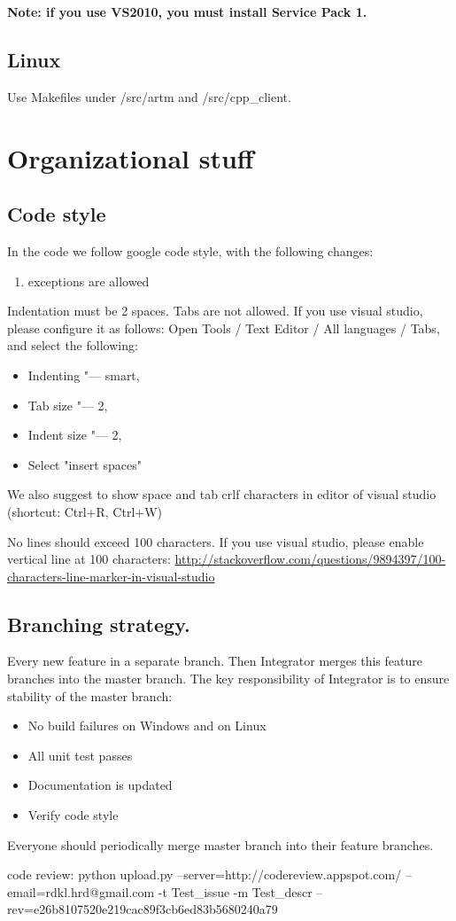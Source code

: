 \documentclass[11pt,a4paper,twoside]{report}
\begin{document}
{\bf Note: if you use VS2010, you must install Service Pack 1.}

\subsection{Linux}

Use Makefiles under /src/artm and /src/cpp\_client.

\section{Organizational stuff}

\subsection{Code style}
In the code we follow google code style, with the following changes:
\begin{enumerate}
    \item exceptions are allowed
\end{enumerate}

\item Indentation must be 2 spaces. Tabs are not allowed.
      If you use visual studio, please configure it as follows:
      Open Tools / Text Editor / All languages / Tabs, and select the following:
      \begin{itemize}
          \item Indenting "--- smart,
          \item Tab size "--- 2,
          \item Indent size "--- 2,
          \item Select "insert spaces"
      \end{itemize}
   We also suggest to show space and tab crlf characters in editor of visual studio (shortcut: Ctrl+R, Ctrl+W)
\item No lines should exceed 100 characters.
      If you use visual studio, please enable vertical line at 100 characters:
      \url{http://stackoverflow.com/questions/9894397/100-characters-line-marker-in-visual-studio}

\subsection{Branching strategy.}
Every new feature in a separate branch.
Then Integrator merges this feature branches into the master branch.
The key responsibility of Integrator is to ensure stability of the master branch:
\begin{itemize}
    \item No build failures on Windows and on Linux
    \item All unit test passes
    \item Documentation is updated
    \item Verify code style
\end{itemize}
Everyone should periodically merge master branch into their feature branches.

code review:
python upload.py --server=http://codereview.appspot.com/ --email=rdkl.hrd@gmail.com  -t Test_issue -m Test_descr --rev=e26b8107520e219cac89f3cb6ed83b5680240a79
\end{document}
